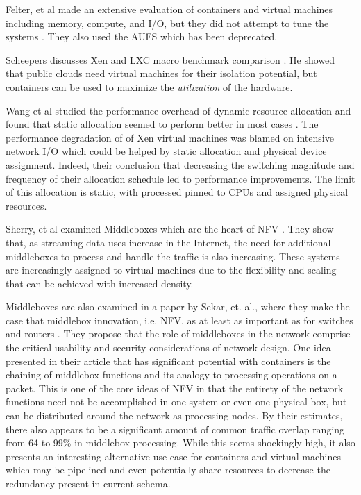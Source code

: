 Felter, et al made an extensive evaluation of containers and virtual machines including memory, compute, and I/O, but they did not attempt to tune the systems \autocite{_felter_1}.
They also used the AUFS which has been deprecated.

Scheepers discusses Xen and LXC macro benchmark comparison \autocite{_scheepers_1}.  
He showed that public clouds need virtual machines for their isolation potential, but containers can be used to maximize the \emph{utilization} of the hardware.

Wang et al studied the performance overhead of dynamic resource allocation and found that static allocation seemed to perform better in most cases \autocite{wangAllocation2007}.
The performance degradation of of Xen virtual machines was blamed on intensive network I/O which could be helped by static allocation and physical device assignment.
Indeed, their conclusion that decreasing the switching magnitude and frequency of their allocation schedule led to performance improvements.  
The limit of this allocation is static, with processed pinned to CPUs and assigned physical resources.

Sherry, et al examined Middleboxes which are the heart of NFV \autocite{_perry_1}.
They show that, as streaming data uses increase in the Internet, the need for additional middleboxes to process and handle the traffic is also increasing.  These systems are increasingly assigned to virtual machines due to the flexibility and scaling that can be achieved with increased density.

Middleboxes are also examined in a paper by Sekar, et. al., where they make the case that middlebox innovation, i.e. NFV, as at least as important as for switches and routers \autocite{sekar2011middlebox}.
They propose that the role of middleboxes in the network comprise the critical usability and security considerations of network design.
One idea presented in their article that has significant potential with containers is the chaining of middlebox functions and its analogy to processing operations on a packet.  
This is one of the core ideas of NFV in that the entirety of the network functions need not be accomplished in one system or even one physical box, but can be distributed around the network as processing nodes.  
By their estimates, there also appears to be a significant amount of common traffic overlap ranging from 64 to 99\% in middlebox processing. 
While this seems shockingly high, it also presents an interesting alternative use case for containers and virtual machines which may be pipelined and even potentially share resources to decrease the redundancy present in current schema.

